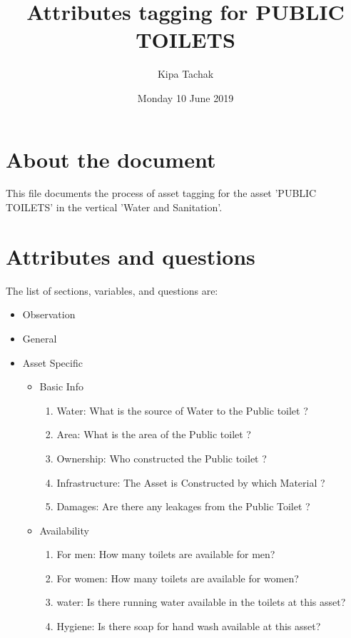 \documentclass[oneside,twocolumn]{article}
\title{Attributes tagging for PUBLIC TOILETS}
\author{Kipa Tachak}
\date{Monday 10 June 2019}
\begin{document}
\maketitle

\section{About the document}
This file documents the process of asset tagging for the asset 'PUBLIC TOILETS' in the
vertical 'Water and Sanitation'.

\section{Attributes and questions}
The list of sections, variables, and questions are:
    \begin{itemize}
    \item Observation
    \item General
    \item Asset Specific
    \begin{itemize}
\item Basic Info
\begin{enumerate}
\item Water: 
What is the source of Water to the Public toilet ? 

\item Area: 
What is the area of the Public toilet ? 

\item Ownership: 
Who constructed the Public toilet ? 

\item Infrastructure: 
The Asset is Constructed by which Material ?

\item Damages: Are there any leakages from the Public Toilet ? 

\end{enumerate}

\item Availability
\begin{enumerate}
\item For men: How many toilets are available for men?
\item For women: How many toilets are available for women?
\item water: Is there running water available in the toilets at this asset?
\item Hygiene: Is there soap for hand wash available at this asset?
\end{enumerate}


\end{itemize}
\end{itemize}
\end{document}
